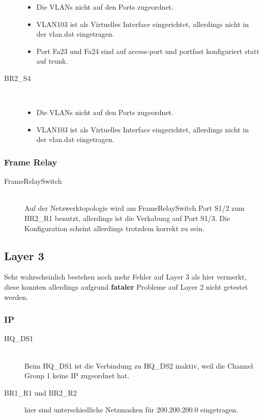 \begin{description}
	  \begin{itemize}
	  	\item Die VLANs nicht auf den Ports zugeordnet.
		  \item VLAN103 ist als Virtuelles Interface eingerichtet, allerdings nicht in der vlan.dat eingetragen.
		  \item Port Fa23 und Fa24 sind auf access-port und portfast konfiguriert statt auf trunk.
		\end{itemize}
	\item[BR2\_S4] \hfill \\
	  \begin{itemize}
	  	\item Die VLANs nicht auf den Ports zugeordnet.
		  \item VLAN103 ist als Virtuelles Interface eingerichtet, allerdings nicht in der vlan.dat eingetragen.
		\end{itemize}
\end{description}

\subsubsection{Frame Relay}

\begin{description}
	\item[FrameRelaySwitch] \hfill \\
	 Auf der Netzwerktopologie wird am FrameRelaySwitch Port S1/2 zum BR2\_R1 benutzt, allerdings ist die Verkabung auf Port S1/3. Die Konfiguration scheint allerdings trotzdem korrekt zu sein.
\end{description}

\subsection{Layer 3}

Sehr wahrscheinlich bestehen noch mehr Fehler auf Layer 3 als hier vermerkt, diese konnten allerdings aufgrund \textbf{fataler} Probleme auf Layer 2 nicht getestet werden.

\subsubsection{IP}


\begin{description}
	\item[HQ\_DS1] \hfill \\
	 Beim HQ\_DS1 ist die Verbindung zu HQ\_DS2 inaktiv, weil die Channel Group 1 keine IP zugeordnet hat.
	 \item[BR1\_R1 und BR2\_R2] hier sind unterschiedliche Netzmasken für 200.200.200.0 eingetragen.
\end{description}

